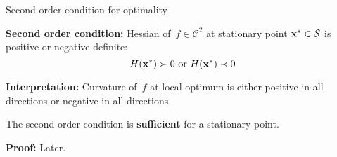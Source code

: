 \documentclass[11pt,compress,t,notes=noshow, xcolor=table]{beamer}
\begin{document}
\begin{vbframe}{Second order condition for optimality}

\vspace{-0.5\baselineskip}

\begin{kframe}
    \textbf{Second order condition:}
    Hessian of~$f \in \mathcal{C}^2$ at stationary point $\mathbf{x}^\ast \in \mathcal{S}$ is positive or negative definite:
    \vspace{-0.5\baselineskip}
    \begin{equation*}
        H(\mathbf{x}^\ast) \succ 0 \text{ or } H(\mathbf{x}^\ast) \prec 0
    \end{equation*}
\end{kframe}

\textbf{Interpretation:} Curvature of~$f$ at local optimum is either positive in all directions or negative in all directions.

\vspace{0.5\baselineskip}

The second order condition is \textbf{sufficient} for a stationary point.

\begin{footnotesize}
    \textbf{Proof:} Later.
\end{footnotesize}






\end{vbframe}
\end{document}

